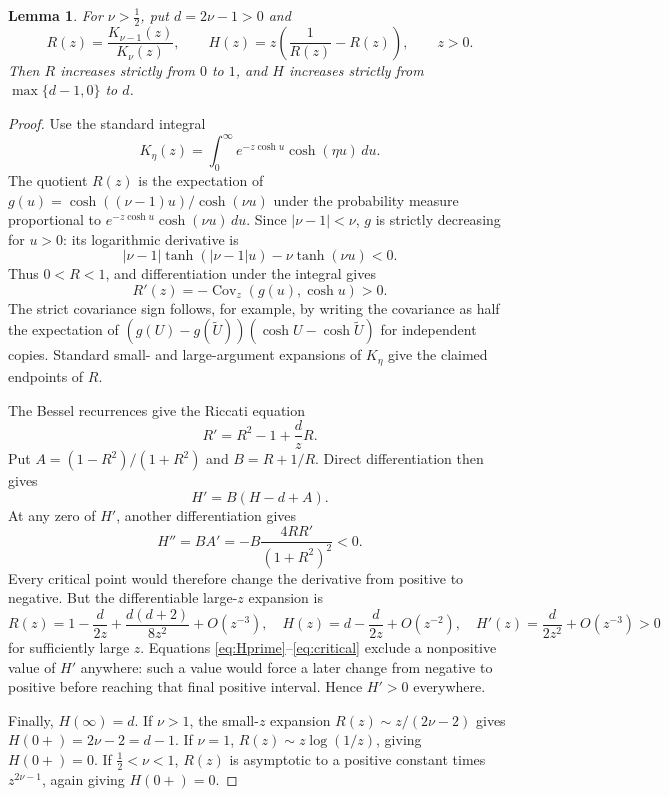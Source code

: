 \documentclass[11pt]{article}
\newtheorem{lemma}{Lemma}
\begin{document}
\begin{lemma}\label{lem:bessel}
For \(\nu>\tfrac12\), put \(d=2\nu-1>0\) and
\[
 R(z)=\frac{K_{\nu-1}(z)}{K_\nu(z)},\qquad
 H(z)=z\left(\frac1{R(z)}-R(z)\right),\qquad z>0.
\]
Then \(R\) increases strictly from \(0\) to \(1\), and \(H\) increases
strictly from \(\max\{d-1,0\}\) to \(d\).
\end{lemma}
\begin{proof}
Use the standard integral
\[
 K_\eta(z)=\int_0^\infty e^{-z\cosh u}\cosh(\eta u)\,du.
\]
The quotient \(R(z)\) is the expectation of
\(g(u)=\cosh((\nu-1)u)/\cosh(\nu u)\) under the probability measure
proportional to \(e^{-z\cosh u}\cosh(\nu u)\,du\).
Since \(|\nu-1|<\nu\), \(g\) is strictly decreasing for \(u>0\):
its logarithmic derivative is
\[
 |\nu-1|\tanh(|\nu-1|u)-\nu\tanh(\nu u)<0.
\]
Thus \(0<R<1\), and differentiation under the integral gives
\[
 R'(z)=-\operatorname{Cov}_z(g(u),\cosh u)>0.
\]
The strict covariance sign follows, for example, by writing the
covariance as half the expectation of
\((g(U)-g(\widetilde U))(\cosh U-\cosh\widetilde U)\)
for independent copies. Standard small- and large-argument expansions
of \(K_\eta\) give the claimed endpoints of \(R\).

The Bessel recurrences give the Riccati equation
\[
 R'=R^2-1+\frac d zR.
\]
Put \(A=(1-R^2)/(1+R^2)\) and \(B=R+1/R\).
Direct differentiation then gives
\begin{equation}\label{eq:Hprime}
 H'=B(H-d+A).
\end{equation}
At any zero of \(H'\), another differentiation gives
\begin{equation}\label{eq:critical}
 H''=BA'=-B\frac{4RR'}{(1+R^2)^2}<0.
\end{equation}
Every critical point would therefore change the derivative from positive
to negative. But the differentiable large-\(z\) expansion is
\[
 R(z)=1-\frac d{2z}+\frac{d(d+2)}{8z^2}+O(z^{-3}),\quad
 H(z)=d-\frac d{2z}+O(z^{-2}),\quad
 H'(z)=\frac d{2z^2}+O(z^{-3})>0
\]
for sufficiently large \(z\). Equations \eqref{eq:Hprime}--\eqref{eq:critical}
exclude a nonpositive value of \(H'\) anywhere: such a value would force
a later change from negative to positive before reaching that final
positive interval. Hence \(H'>0\) everywhere.

Finally, \(H(\infty)=d\). If \(\nu>1\), the small-\(z\) expansion
\(R(z)\sim z/(2\nu-2)\) gives \(H(0+)=2\nu-2=d-1\).
If \(\nu=1\), \(R(z)\sim z\log(1/z)\), giving \(H(0+)=0\).
If \(\tfrac12<\nu<1\), \(R(z)\) is asymptotic to a positive constant
times \(z^{2\nu-1}\), again giving \(H(0+)=0\).
\end{proof}
\end{document}
